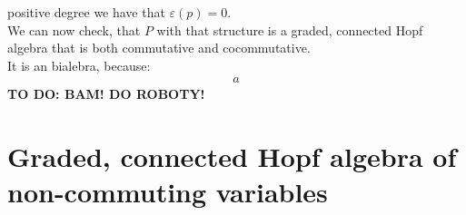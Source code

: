 \documentclass[a4paper, 12pt]{report}
\newcommand{\todo}[1]{\hfill \break \textbf{\Huge TO DO: #1 \hfill \break}\normalsize}
\begin{document}
positive degree we have that $\varepsilon(p) = 0$. \\
We can now check, that $P$ with that structure is a graded, connected Hopf algebra that is both commutative
and cocommutative. \\
It is an bialebra, because:
\begin{align*}
a
\end{align*}
\todo{BAM! DO ROBOTY!}
\section{Graded, connected Hopf algebra of non-commuting variables}
\end{document}
